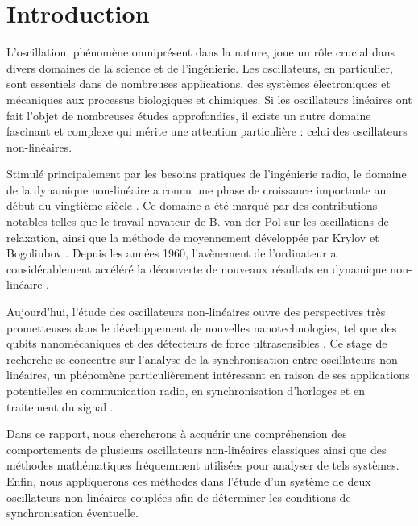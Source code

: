 \chapter{Introduction}
L'oscillation, phénomène omniprésent dans la nature, joue un rôle crucial dans divers domaines de la science et de l'ingénierie. Les oscillateurs, en particulier, sont essentiels dans de nombreuses applications, des systèmes électroniques et mécaniques aux processus biologiques et chimiques. Si les oscillateurs linéaires ont fait l'objet de nombreuses études approfondies, il existe un autre domaine fascinant et complexe qui mérite une attention particulière : celui des oscillateurs non-linéaires.

Stimulé principalement par les besoins pratiques de l'ingénierie radio,
le domaine de la dynamique non-linéaire a connu une phase de croissance importante au début du vingtième siècle \cite{samoilenko_nn_1994}.
Ce domaine a été marqué par des contributions notables telles que le travail novateur de B. van der Pol sur les oscillations de relaxation, ainsi que la méthode de moyennement développée par Krylov et Bogoliubov \cite{mira_historical_1997}. Depuis les années 1960, l'avènement de l'ordinateur a considérablement accéléré la découverte de nouveaux résultats en dynamique non-linéaire \cite{mira_historical_1997}.

Aujourd'hui, l'étude des oscillateurs non-linéaires ouvre des perspectives très prometteuses dans le développement de nouvelles nanotechnologies, tel que des qubits nanomécaniques \cite{pistolesi_proposal_2021} et des détecteurs de force ultrasensibles \cite{moser_ultrasensitive_2013}. Ce stage de recherche se concentre sur l'analyse de la synchronisation entre oscillateurs non-linéaires, un phénomène particulièrement intéressant en raison de ses applications potentielles en communication radio, en synchronisation d'horloges et en traitement du signal \cite{djorwe_self-organized_2020}.

Dans ce rapport, nous chercherons à acquérir une compréhension des 
comportements de plusieurs oscillateurs non-linéaires classiques ainsi que 
des méthodes mathématiques fréquemment utilisées pour analyser de tels systèmes. 
Enfin, nous appliquerons ces méthodes dans l'étude d'un système 
de deux oscillateurs non-linéaires couplées afin de déterminer les conditions de synchronisation éventuelle.


